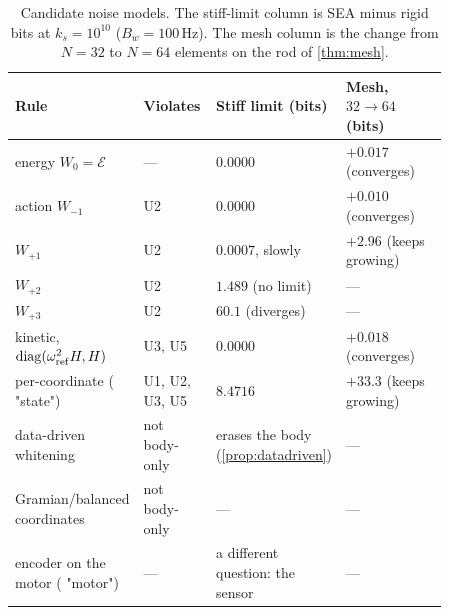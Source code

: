 \documentclass[11pt]{article}
\theoremstyle{definition}
\theoremstyle{remark}
\newcommand{\diag}{\operatorname{diag}}
\newcommand{\Em}{\mathcal{E}}         %
\newcommand{\codeus}{\textunderscore\allowbreak}
\newcommand{\code}[1]{{\ttfamily\let\_\codeus\hyphenchar\font=-1 #1}}
\begin{document}
\begin{table}[t]\centering\small
\caption{Candidate noise models. The stiff-limit column is SEA minus rigid bits at
$k_s=10^{10}$ ($B_w=100$\,Hz). The mesh column is the change from $N=32$ to $N=64$
elements on the rod of \cref{thm:mesh}.}
\label{tab:rules}
\begin{tabular}{>{\raggedright}p{0.25\linewidth}p{0.17\linewidth}>{\raggedright}p{0.17\linewidth}>{\raggedright\arraybackslash}p{0.27\linewidth}}
\toprule
Rule & Violates & Stiff limit (bits) & Mesh, $32\to64$ (bits)\\
\midrule
energy $W_0=\Em$ & --- & $0.0000$ & $+0.017$ (converges)\\
action $W_{-1}$ & U2 & $0.0000$ & $+0.010$ (converges)\\
$W_{+1}$ & U2 & $0.0007$, slowly & $+2.96$ (keeps growing)\\
$W_{+2}$ & U2 & $1.489$ (no limit) & ---\\
$W_{+3}$ & U2 & $60.1$ (diverges) & ---\\
kinetic, $\diag(\omega_{\rm ref}^2H,H)$ & U3, U5 & $0.0000$ & $+0.018$ (converges)\\
per-coordinate (\code{"state"}) & U1, U2, U3, U5 & $8.4716$ & $+33.3$ (keeps growing)\\
data-driven whitening & not body-only & erases the body (\cref{prop:datadriven}) & ---\\
Gramian/balanced coordinates & not body-only & --- & ---\\
encoder on the motor (\code{"motor"}) & --- & a different question: the sensor & ---\\
\bottomrule
\end{tabular}
\end{table}
\end{document}

